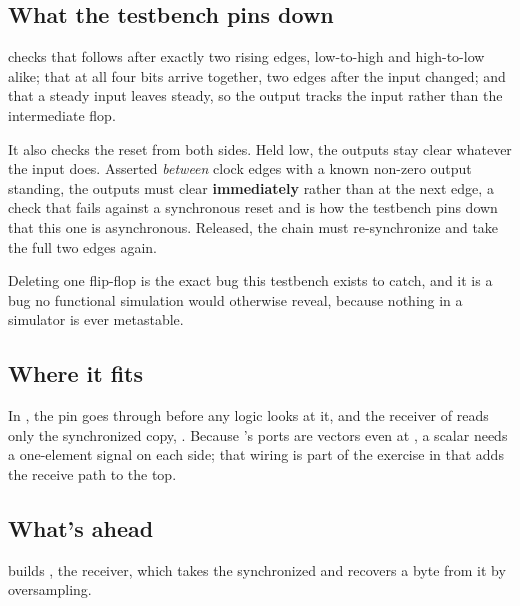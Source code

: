\subsection{What the testbench pins down}
\label{c3:sec:sync_tb}
 checks that  follows  after exactly two rising edges,
low-to-high and high-to-low alike; that at  all four bits arrive together, two edges
after the input changed; and that a steady input leaves  steady, so the output tracks
the input rather than the intermediate flop.

It also checks the reset from both sides. Held low, the outputs stay clear whatever the input does.
Asserted \emph{between} clock edges with a known non-zero output standing, the outputs must clear
\textbf{immediately} rather than at the next edge, a check that fails against a synchronous reset
and is how the testbench pins down that this one is asynchronous. Released, the chain must
re-synchronize and take the full two edges again.

Deleting one flip-flop is the exact bug this testbench exists to catch, and it is a bug no
functional simulation would otherwise reveal, because nothing in a simulator is ever metastable.

\subsection{Where it fits}
\label{c3:sec:sync_fits}
In , the  pin goes through  before any logic looks at it, and the
receiver of  reads only the synchronized copy, . Because 's
ports are vectors even at , a scalar  needs a one-element signal on each
side; that wiring is part of the exercise in  that adds the receive path to the top.

\subsection{What's ahead}
 builds , the receiver, which takes the synchronized 
and recovers a byte from it by oversampling.
